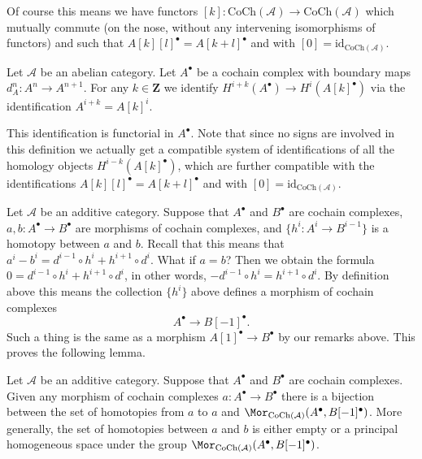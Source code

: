 \noindent
Of course this means we have functors
$[k] : \text{CoCh}(\mathcal{A}) \to \text{CoCh}(\mathcal{A})$
which mutually commute (on the nose, without
any intervening isomorphisms of functors) and
such that $A[k][l]^\bullet = A[k + l]^\bullet$ and
with $[0] = \text{id}_{\text{CoCh}(\mathcal{A})}$.

\begin{definition}
\label{definition-cohomology-shift}
Let $\mathcal{A}$ be an abelian category.
Let $A^\bullet$ be a cochain complex
with boundary maps $d_A^n : A^n \to A^{n + 1}$.
For any $k \in \mathbf{Z}$ we identify
{\it $H^{i + k}(A^\bullet) \longrightarrow H^i(A[k]^\bullet)$}
via the identification $A^{i + k} = A[k]^i$.
\end{definition}

\noindent
This identification is functorial in $A^\bullet$.
Note that since no signs are involved in this
definition we actually get a compatible system
of identifications of all the homology
objects $H^{i - k}(A[k]^\bullet)$, which are
further compatible with the identifications
$A[k][l]^\bullet = A[k + l]^\bullet$ and
with $[0] = \text{id}_{\text{CoCh}(\mathcal{A})}$.

\medskip\noindent
Let $\mathcal{A}$ be an additive category.
Suppose that $A^\bullet$ and $B^\bullet$ are
cochain complexes, $a, b : A^\bullet \to B^\bullet$ are
morphisms of cochain complexes, and $\{h^i : A^i \to B^{i - 1}\}$
is a homotopy between $a$ and $b$. Recall that this means
that
$a^i - b^i = d^{i - 1} \circ h^i + h^{i + 1} \circ d^i$.
What if $a = b$? Then we obtain the formula
$0 = d^{i - 1} \circ h^i + h^{i + 1} \circ d^i$,
in other words, $ - d^{i - 1} \circ h^i = h^{i + 1} \circ d^i$.
By definition above this means the collection $\{h^i\}$
above defines a morphism of cochain complexes
$$
A^\bullet \longrightarrow B[-1]^\bullet.
$$
Such a thing is the same as a morphism $A[1]^\bullet \to B^\bullet$
by our remarks above. This proves the following lemma.

\begin{lemma}
\label{lemma-homotopy-shift-cochain}
Let $\mathcal{A}$ be an additive category.
Suppose that $A^\bullet$ and $B^\bullet$ are
cochain complexes. Given any morphism of cochain
complexes $a : A^\bullet \to B^\bullet$ there
is a bijection between the set of homotopies
from $a$ to $a$ and
$\Mor_{\text{CoCh}(\mathcal{A})}(A^\bullet, B[-1]^\bullet)$.
More generally, the set of homotopies between
$a$ and $b$ is either empty or a principal homogeneous
space under the group
$\Mor_{\text{CoCh}(\mathcal{A})}(A^\bullet, B[-1]^\bullet)$.
\end{lemma}

